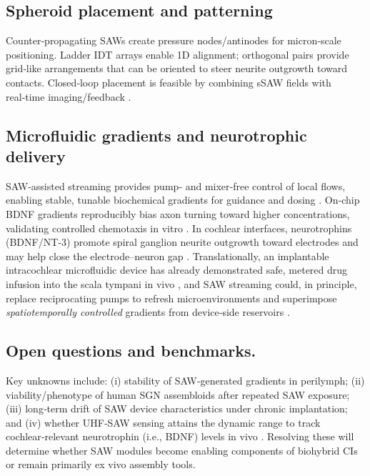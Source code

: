 \documentclass[referee,pdflatex, sn-vancouver-num]{sn-jnl}%
\theoremstyle{thmstyleone}%
\theoremstyle{thmstyletwo}%
\theoremstyle{thmstylethree}%
\begin{document}
\subsection{Spheroid placement and patterning}
Counter‑propagating SAWs create pressure nodes/antinodes for micron‑scale positioning. Ladder IDT arrays enable 1D alignment; orthogonal pairs provide grid‑like arrangements that can be oriented to steer neurite outgrowth toward contacts. Closed‑loop placement is feasible by combining sSAW fields with real‑time imaging/feedback \cite{rufo2022,Gedge2012_SAW,Cai2020_Biofabrication, Gedge2015_Theory_of_Surface_Acoustic_Wave_Device}.

\subsection{Microfluidic gradients and neurotrophic delivery}
SAW‑assisted streaming provides pump‑ and mixer‑free control of local flows, enabling stable, tunable biochemical gradients for guidance and dosing \cite{Friend2011,Ding2013,Zhang2020_AcousticMicrofluidics}. On‑chip BDNF gradients reproducibly bias axon turning toward higher concentrations, validating controlled chemotaxis in vitro \cite{Huang2014_BDNF}. In cochlear interfaces, neurotrophins (BDNF/NT‑3) promote spiral ganglion neurite outgrowth toward electrodes and may help close the electrode–neuron gap \cite{Schmidbauer2023}. Translationally, an implantable intracochlear microfluidic device has already demonstrated safe, metered drug infusion into the scala tympani in vivo \cite{Sewell2009}, and SAW streaming could, in principle, replace reciprocating pumps to refresh microenvironments and superimpose \emph{spatiotemporally controlled} gradients from device‑side reservoirs \cite{Friend2011,Ding2013}.

\subsection{Open questions and benchmarks.}
Key unknowns include: (i) stability of SAW‑generated gradients in perilymph; (ii) viability/phenotype of human SGN assembloids after repeated SAW exposure; (iii) long‑term drift of SAW device characteristics under chronic implantation; and (iv) whether UHF‑SAW sensing attains the dynamic range to track cochlear‑relevant neurotrophin (i.e., BDNF) levels in vivo \cite{rufo2022,Agostini2021_UHFSAW}. Resolving these will determine whether SAW modules become enabling components of biohybrid CIs or remain primarily ex vivo assembly tools.
\end{document}
